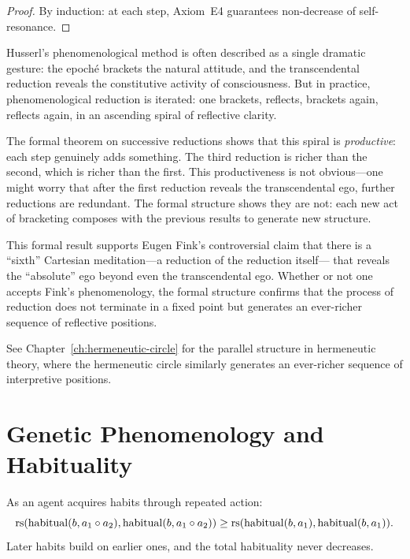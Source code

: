 \begin{proof}
By induction: at each step, Axiom~E4 guarantees non-decrease of self-resonance.
\end{proof}

\begin{interpretation}
\label{interp:reduction-ladder}
Husserl's phenomenological method is often described as a single dramatic
gesture: the epoch\'e brackets the natural attitude, and the transcendental
reduction reveals the constitutive activity of consciousness.  But in
practice, phenomenological reduction is iterated: one brackets, reflects,
brackets again, reflects again, in an ascending spiral of reflective clarity.

The formal theorem on successive reductions shows that this spiral is
\emph{productive}: each step genuinely adds something.  The third reduction
is richer than the second, which is richer than the first.  This
productiveness is not obvious---one might worry that after the first
reduction reveals the transcendental ego, further reductions are redundant.
The formal structure shows they are not: each new act of bracketing
composes with the previous results to generate new structure.

This formal result supports Eugen Fink's controversial claim that there is
a ``sixth'' Cartesian meditation---a reduction of the reduction itself---
that reveals the ``absolute'' ego beyond even the transcendental ego.
Whether or not one accepts Fink's phenomenology, the formal structure
confirms that the process of reduction does not terminate in a fixed point
but generates an ever-richer sequence of reflective positions.

See Chapter~\ref{ch:hermeneutic-circle} for the parallel structure in
hermeneutic theory, where the hermeneutic circle similarly generates an
ever-richer sequence of interpretive positions.
\end{interpretation}

\section{Genetic Phenomenology and Habituality}

\begin{theorem}
\label{thm:habituality-grows}
As an agent acquires habits through repeated action:
\[
\mathrm{rs}(\mathrm{habitual}(b, a_1 \circ a_2), \mathrm{habitual}(b, a_1 \circ a_2))
\geq \mathrm{rs}(\mathrm{habitual}(b, a_1), \mathrm{habitual}(b, a_1)).
\]
Later habits build on earlier ones, and the total habituality never decreases.
\end{theorem}

